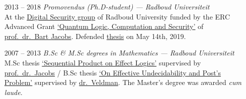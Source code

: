 \documentclass{article}
\newcommand\hsep{ {\color{gray}/} }
\begin{document}
\begin{itemize}
            
    \item[2013 -- 2018]  \emph{Promovendus (Ph.D-student) ---
        Radboud Universiteit}\\
        At the \href{http://www.ru.nl/ds/}{Digital Security group}
        of Radboud University funded by
        the ERC Advanced Grant \href{https://cordis.europa.eu/project/rcn/107285_en.html}{`Quantum Logic, Computation and Security'}
        of \href{http://www.cs.ru.nl/B.Jacobs/}{prof.~dr.~Bart Jacobs}.
            Defended
            \href{http://westerbaan.name/~bas/thesis.pdf}{thesis}
            on May 14th, 2019.
    \item[2007 -- 2013] \emph{B.Sc \& M.Sc degrees in Mathematics ---
                Radboud Universiteit} \\
        M.Sc thesis \href{www.ru.nl/publish/pages/813276/masterscriptie_bas_westerbaan.pdf}{`Sequential Product on Effect Logics'}
            supervised by \href{http://www.cs.ru.nl/B.Jacobs/}{prof.~dr.~Jacobs} \hsep
        B.Sc thesis \href{https://arxiv.org/abs/1409.1030}{`On Effective Undecidability and Post's Problem'}
            supervised by \href{http://www.ru.nl/wiskunde/@1039532/veldman-dhr-dr-(wim)/}{dr.~Veldman}.
        The Master's degree was awarded \emph{cum laude}.
\end{itemize}
\end{document}
